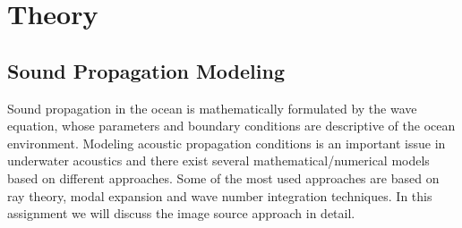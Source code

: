 \chapter*{Theory} 
\section{ Sound Propagation Modeling } \label{ Sound Propagation Modeling }
\noindent Sound propagation in the ocean is mathematically formulated by the wave equation, whose parameters and boundary conditions are descriptive of the ocean environment. Modeling acoustic propagation conditions is an important issue in underwater acoustics and there exist several mathematical/numerical models based on different approaches. Some of the most used approaches are based on ray theory, modal expansion and wave number integration techniques. In this assignment we will discuss the image source approach in detail.

